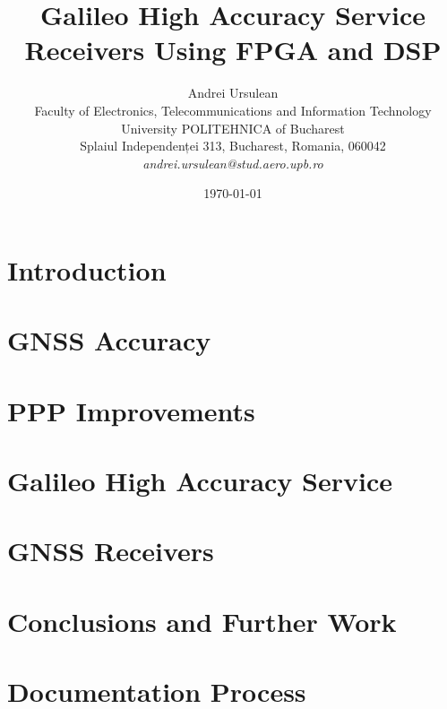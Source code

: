 \documentclass[12pt]{article}
\title{Galileo High Accuracy Service Receivers Using FPGA and DSP}
\author{Andrei Ursulean\\
Faculty of Electronics, Telecommunications and Information Technology\\
University POLITEHNICA of Bucharest\\
Splaiul Independenței 313, Bucharest, Romania, 060042 \\
\emph{andrei.ursulean@stud.aero.upb.ro}}
\date{\today}
\begin{document}
\maketitle

\begin{abstract}

\end{abstract}

\section{Introduction}
\label{sec:introduction}


% 

\section{GNSS Accuracy}
\label{sec:gnss_accuracy}


\section{PPP Improvements}
\label{sec:gnss_ppp}

 
\section{Galileo High Accuracy Service}
\label{sec:galileo_has}

\FloatBarrier

\section{GNSS Receivers}
\label{sec:gnss_receivers}

\FloatBarrier

\section{Conclusions and Further Work}
\label{sec:conclusion}


\section{Documentation Process}
\label{sec:documentation}




\end{document}
